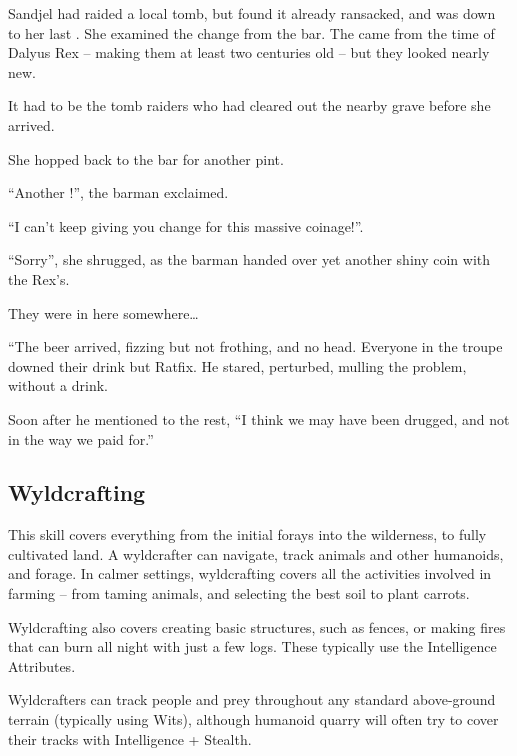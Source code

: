 \begin{multicols}{2}
\ifodd\value{r4}
\begin{exampletext}
  Sandjel had raided a local tomb, but found it already ransacked, and was down to her last .
  She examined the change from the bar.
  The  came from the time of Dalyus Rex -- making them at least two centuries old -- but they looked nearly new.

  It had to be the tomb raiders who had cleared out the nearby grave before she arrived.

  She hopped back to the bar for another pint.

  ``Another !'',
  the barman exclaimed.

  ``I can't keep giving you change for this massive coinage!''.

  ``Sorry'',
  she shrugged, as the barman handed over yet another shiny coin with the Rex's.

  They were in here somewhere\ldots

\end{exampletext}

\else

\begin{exampletext}
  ``The beer arrived, fizzing but not frothing, and no head.
  Everyone in the troupe downed their drink but Ratfix.
  He stared, perturbed, mulling the problem, without a drink.

  Soon after he mentioned to the rest,
  ``I think we may have been drugged, and not in the way we paid for.''
\end{exampletext}
\fi

\subsection{Wyldcrafting}

This skill covers everything from the initial forays into the wilderness, to fully cultivated land.
A wyldcrafter can navigate, track animals and other humanoids, and forage.
In calmer settings, wyldcrafting covers all the activities involved in farming -- from taming animals, and selecting the best soil to plant carrots.

Wyldcrafting also covers creating basic structures, such as fences, or making fires that can burn all night with just a few logs.
These typically use the Intelligence Attributes.

Wyldcrafters can track people and prey throughout any standard above-ground terrain (typically using Wits), although humanoid quarry will often try to cover their tracks with Intelligence + Stealth.


\end{multicols}
